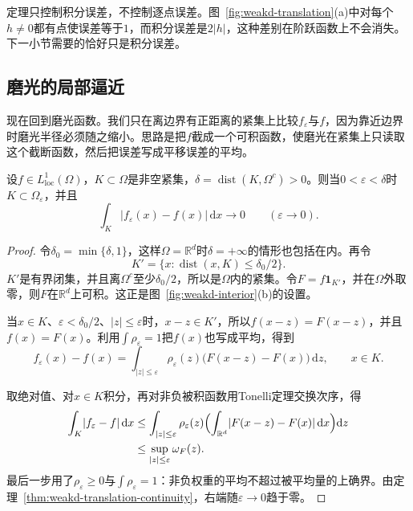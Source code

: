 定理只控制积分误差，不控制逐点误差。图~\ref{fig:weakd-translation}(a)中对每个$h\neq0$都有点使误差等于$1$，而积分误差是$2\lvert h\rvert$，这种差别在阶跃函数上不会消失。下一小节需要的恰好只是积分误差。

\subsection{磨光的局部逼近}
\label{sec:weakd-local-approximation}

现在回到磨光函数。我们只在离边界有正距离的紧集上比较$f_\varepsilon$与$f$，因为靠近边界时磨光半径必须随之缩小。思路是把$f$截成一个可积函数，使磨光在紧集上只读取这个截断函数，然后把误差写成平移误差的平均。

\begin{theorem}[磨光的局部积分逼近]
\label{thm:weakd-local-approximation}
设$f\in L^1_{\mathrm{loc}}(\Omega)$，$K\subset\Omega$是非空紧集，$\delta=\operatorname{dist}(K,\Omega^{c})>0$。则当$0<\varepsilon<\delta$时$K\subset\Omega_\varepsilon$，并且
\begin{equation}
\int_K\lvert f_\varepsilon(x)-f(x)\rvert\,\mathrm dx\to0\qquad(\varepsilon\to0).
\label{eq:weakd-local-approximation}
\end{equation}
\end{theorem}

\begin{proof}
令$\delta_0=\min\{\delta,1\}$，这样$\Omega=\mathbb R^d$时$\delta=+\infty$的情形也包括在内。再令
\[
K'=\{x:\operatorname{dist}(x,K)\leq\delta_0/2\}.
\]
$K'$是有界闭集，并且离$\Omega^{c}$至少$\delta_0/2$，所以是$\Omega$内的紧集。令$F=f\mathbf 1_{K'}$，并在$\Omega$外取零，则$F$在$\mathbb R^d$上可积。这正是图~\ref{fig:weakd-interior}(b)的设置。

当$x\in K$、$\varepsilon<\delta_0/2$、$\lvert z\rvert\leq\varepsilon$时，$x-z\in K'$，所以$f(x-z)=F(x-z)$，并且$f(x)=F(x)$。利用$\int\rho_\varepsilon=1$把$f(x)$也写成平均，得到
\[
f_\varepsilon(x)-f(x)=\int_{\lvert z\rvert\leq\varepsilon}\rho_\varepsilon(z)\bigl(F(x-z)-F(x)\bigr)\,\mathrm dz ,\qquad x\in K .
\]

取绝对值、对$x\in K$积分，再对非负被积函数用Tonelli定理交换次序，得
\[
\begin{aligned}
\int_K\lvert f_\varepsilon-f\rvert\,\mathrm dx
&\leq\int_{\lvert z\rvert\leq\varepsilon}\rho_\varepsilon(z)\Bigl(\int_{\mathbb R^d}\lvert F(x-z)-F(x)\rvert\,\mathrm dx\Bigr)\mathrm dz\\
&\leq\sup_{\lvert z\rvert\leq\varepsilon}\omega_F(z).
\end{aligned}
\]
最后一步用了$\rho_\varepsilon\geq0$与$\int\rho_\varepsilon=1$：非负权重的平均不超过被平均量的上确界。由定理~\ref{thm:weakd-translation-continuity}，右端随$\varepsilon\to0$趋于零。
\end{proof}

